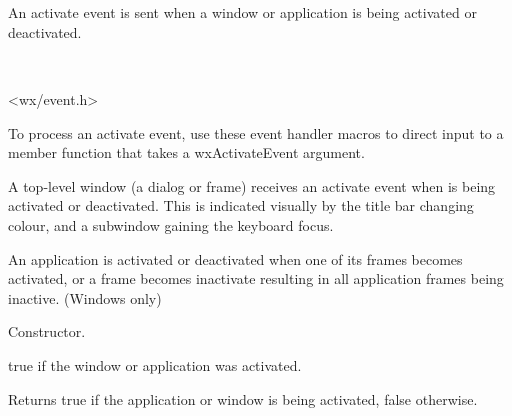 \section{}\label{wxactivateevent}

An activate event is sent when a window or application is being activated
or deactivated.


\\


<wx/event.h>


To process an activate event, use these event handler macros to direct input to a member
function that takes a wxActivateEvent argument.

\twocolwidtha{7cm}
\begin{twocollist}\itemsep=0pt
\end{twocollist}%


A top-level window (a dialog or frame) receives an activate event when is
being activated or deactivated. This is indicated visually by the title
bar changing colour, and a subwindow gaining the keyboard focus.

An application is activated or deactivated when one of its frames becomes activated,
or a frame becomes inactivate resulting in all application frames being inactive. (Windows only)


{}


\label{wxactivateeventctor}


Constructor.

\label{wxactivateeventmactive}


true if the window or application was activated.

\label{wxactivateeventgetactive}


Returns true if the application or window is being activated, false otherwise.

